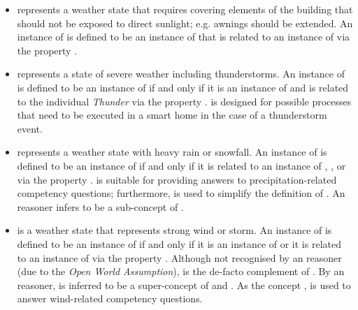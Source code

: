 \begin{itemize}
  \item {} represents a weather state that requires covering elements of the building that should not be exposed to direct sunlight; e.g. awnings should be extended. An instance of  is defined to be an instance of  that is related to an instance of  via the property .
  
  \item {} represents a state of severe weather including thunderstorms. An instance of  is defined to be an instance of  if and only if it is an instance of  and is related to the individual \emph{Thunder} via the property .  is designed for possible processes that need to be executed in a smart home in the case of a thunderstorm event.
  
  \item {} represents a weather state with heavy rain or snowfall. An instance of  is defined to be an instance of  if and only if it is related to an instance of , , or  via the property .  is suitable for providing answers to precipitation-related competency questions; furthermore,  is used to simplify the definition of . An  reasoner infers  to be a sub-concept of .
  
  \item {} is a weather state that represents strong wind or storm. An instance of  is defined to be an instance of  if and only if it is an instance of  or it is related to an instance of  via the property . Although not recognised by an  reasoner (due to the \emph{Open World Assumption}),  is the de-facto complement of . By an  reasoner,  is inferred to be a super-concept of  and . As the concept ,  is used to answer wind-related competency questions.
\end{itemize}


